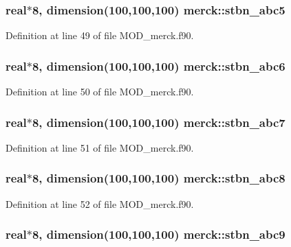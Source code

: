\hypertarget{classmerck_ac1cdfb5eb8152a98b0f7e19ccde5ad4d}{
\subsubsection[{stbn\-\_\-abc5}]{\setlength{\rightskip}{0pt plus 5cm}real$\ast$8, dimension(100,100,100) merck\-::stbn\-\_\-abc5}}\label{classmerck_ac1cdfb5eb8152a98b0f7e19ccde5ad4d}


Definition at line 49 of file M\-O\-D\-\_\-merck.\-f90.

\hypertarget{classmerck_a90a3118b94446f5d2523da9d4460b6b6}{
\subsubsection[{stbn\-\_\-abc6}]{\setlength{\rightskip}{0pt plus 5cm}real$\ast$8, dimension(100,100,100) merck\-::stbn\-\_\-abc6}}\label{classmerck_a90a3118b94446f5d2523da9d4460b6b6}


Definition at line 50 of file M\-O\-D\-\_\-merck.\-f90.

\hypertarget{classmerck_a4e518aa4974e3e9a4a181e3469ec0727}{
\subsubsection[{stbn\-\_\-abc7}]{\setlength{\rightskip}{0pt plus 5cm}real$\ast$8, dimension(100,100,100) merck\-::stbn\-\_\-abc7}}\label{classmerck_a4e518aa4974e3e9a4a181e3469ec0727}


Definition at line 51 of file M\-O\-D\-\_\-merck.\-f90.

\hypertarget{classmerck_a01e392d546665c27adb268047d288cef}{
\subsubsection[{stbn\-\_\-abc8}]{\setlength{\rightskip}{0pt plus 5cm}real$\ast$8, dimension(100,100,100) merck\-::stbn\-\_\-abc8}}\label{classmerck_a01e392d546665c27adb268047d288cef}


Definition at line 52 of file M\-O\-D\-\_\-merck.\-f90.

\hypertarget{classmerck_aa2388ec2aea5655e7e303755395d1be0}{
\subsubsection[{stbn\-\_\-abc9}]{\setlength{\rightskip}{0pt plus 5cm}real$\ast$8, dimension(100,100,100) merck\-::stbn\-\_\-abc9}}\label{classmerck_aa2388ec2aea5655e7e303755395d1be0}


